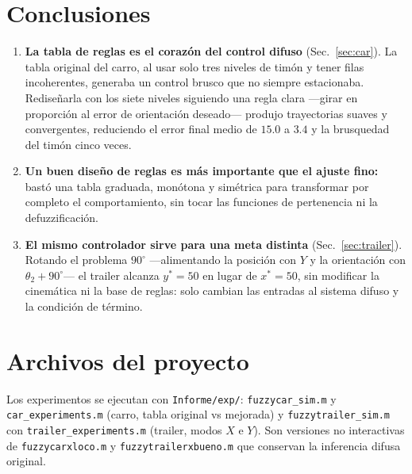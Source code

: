 \documentclass[11pt,a4paper]{article}
\newcommand{\code}[1]{\texttt{\small #1}}
\begin{document}
\section{Conclusiones}
\begin{enumerate}
  \item \textbf{La tabla de reglas es el corazón del control difuso} (Sec.~\ref{sec:car}).
  La tabla original del carro, al usar solo tres niveles de timón y tener filas
  incoherentes, generaba un control brusco que no siempre estacionaba. Rediseñarla con los
  siete niveles siguiendo una regla clara —girar en proporción al error de orientación
  deseado— produjo trayectorias suaves y convergentes, reduciendo el error final medio de
  $15.0$ a $3.4$ y la brusquedad del timón cinco veces.

  \item \textbf{Un buen diseño de reglas es más importante que el ajuste fino:} bastó una
  tabla graduada, monótona y simétrica para transformar por completo el comportamiento,
  sin tocar las funciones de pertenencia ni la defuzzificación.

  \item \textbf{El mismo controlador sirve para una meta distinta} (Sec.~\ref{sec:trailer}).
  Rotando el problema $90^\circ$ —alimentando la posición con $Y$ y la orientación con
  $\theta_2+90^\circ$— el trailer alcanza $y^*=50$ en lugar de $x^*=50$, sin modificar la
  cinemática ni la base de reglas: solo cambian las entradas al sistema difuso y la
  condición de término.
\end{enumerate}

\appendix
\section{Archivos del proyecto}
Los experimentos se ejecutan con \code{Informe/exp/}: \code{fuzzycar\_sim.m} y
\code{car\_experiments.m} (carro, tabla original vs mejorada) y
\code{fuzzytrailer\_sim.m} con \code{trailer\_experiments.m} (trailer, modos $X$ e $Y$).
Son versiones no interactivas de \code{fuzzycarxloco.m} y \code{fuzzytrailerxbueno.m} que
conservan la inferencia difusa original.
\end{document}
